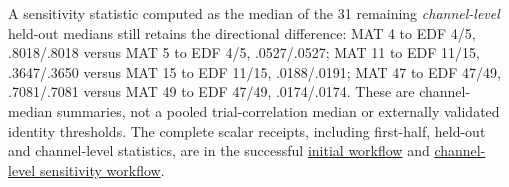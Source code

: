 A sensitivity statistic computed as the median of the 31 remaining
\emph{channel-level} held-out medians still retains the directional
difference: MAT 4 to EDF 4/5, .8018/.8018 versus MAT 5 to EDF 4/5,
.0527/.0527; MAT 11 to EDF 11/15, .3647/.3650 versus MAT 15 to
EDF 11/15, .0188/.0191; MAT 47 to EDF 47/49, .7081/.7081 versus
MAT 49 to EDF 47/49, .0174/.0174. These are channel-median
summaries, not a pooled trial-correlation median or externally
validated identity thresholds. The complete scalar receipts,
including first-half, held-out and channel-level statistics, are in
the successful \href{https://github.com/lindicaphxag-tech/kaggle/actions/runs/38359640970}{initial workflow}
and \href{https://github.com/lindicaphxag-tech/kaggle/actions/runs/38360228555}{channel-level sensitivity workflow}.
